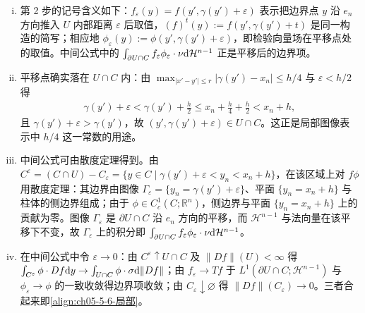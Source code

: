 \documentclass[../../main.tex]{subfiles}%
\begin{document}
\begin{remark}\label{remark:ch05-def-5-3-补全}
\begin{enumerate}[(i)]
\item 第 2 步的记号含义如下：$f_{\varepsilon}(y)=f(y',\gamma(y')+\varepsilon)$ 表示把边界点 $y$ 沿 $e_n$ 方向推入 $U$ 内部距离 $\varepsilon$ 后取值，$(f)^t(y):=f(y',\gamma(y')+t)$ 是同一构造的简写；相应地 $\phi_{\varepsilon}(y):=\phi(y',\gamma(y')+\varepsilon)$，即检验向量场在平移点处的取值。中间公式中的 $\int_{\partial U\cap C}f_{\varepsilon}\phi_{\varepsilon}\cdot\nu\mathrm{d}\mathcal{H}^{n-1}$ 正是平移后的边界项。

\item 平移点确实落在 $U\cap C$ 内：由 $\max_{\lvert x'-y'\rvert\leqslant r}\lvert\gamma(y')-x_n\rvert\leqslant h/4$ 与 $\varepsilon<h/2$ 得
\begin{align*}
\gamma(y')+\varepsilon<\gamma(y')+\frac{h}{2}\leqslant x_n+\frac{h}{4}+\frac{h}{2}<x_n+h,
\end{align*}
且 $\gamma(y')+\varepsilon>\gamma(y')$，故 $(y',\gamma(y')+\varepsilon)\in U\cap C$。这正是局部图像表示中 $h/4$ 这一常数的用途。

\item 中间公式可由散度定理得到。由 $C^{\varepsilon}=(C\cap U)-C_{\varepsilon}=\{y\in C\mid\gamma(y')+\varepsilon<y_n<x_n+h\}$，在该区域上对 $f\phi$ 用散度定理：其边界由图像 $\Gamma_{\varepsilon}=\{y_n=\gamma(y')+\varepsilon\}$、平面 $\{y_n=x_n+h\}$ 与柱体的侧边界组成；由于 $\phi\in C_c^1(C;\mathbb{R}^n)$，侧边界与平面 $\{y_n=x_n+h\}$ 上的贡献为零。图像 $\Gamma_{\varepsilon}$ 是 $\partial U\cap C$ 沿 $e_n$ 方向的平移，而 $\mathcal{H}^{n-1}$ 与法向量在该平移下不变，故 $\Gamma_{\varepsilon}$ 上的积分即 $\int_{\partial U\cap C}f_{\varepsilon}\phi_{\varepsilon}\cdot\nu\mathrm{d}\mathcal{H}^{n-1}$。

\item 在中间公式中令 $\varepsilon\to0$：由 $C^{\varepsilon}\uparrow U\cap C$ 及 $\lVert Df\rVert(U)<\infty$ 得 $\int_{C^{\varepsilon}}\phi\cdot Df\mathrm{d} y\to\int_{U\cap C}\phi\cdot\sigma\mathrm{d}\lVert Df\rVert$；由 $f_{\varepsilon}\to Tf$ 于 $L^1(\partial U\cap C;\mathcal{H}^{n-1})$ 与 $\phi_{\varepsilon}\to\phi$ 的一致收敛得边界项收敛；由 $C_{\varepsilon}\downarrow\varnothing$ 得 $\lVert Df\rVert(C_{\varepsilon})\to0$。三者合起来即\eqref{align:ch05-5-6-局部}。


\end{enumerate}
\end{remark}
\end{document}
